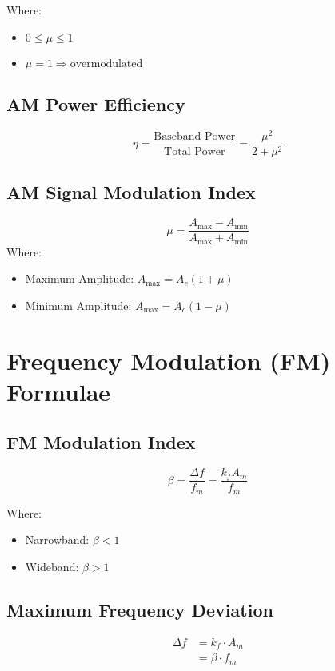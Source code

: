 \documentclass[12pt]{article}
\begin{document}
\noindent Where:
\begin{itemize}
	\item $0 \leq \mu \leq 1$
	\item $\mu = 1 \Rightarrow \text{overmodulated}$
\end{itemize}

\subsection{AM Power Efficiency}
\[
	\eta = \frac{\text{Baseband Power}}{\text{Total Power}} = \frac{\mu^2}{2 + \mu^2}
\]

\subsection{AM Signal Modulation Index}
\[
	\mu = \frac{A_{\text{max}} - A_{\text{min}}}{A_{\text{max}} + A_{\text{min}}}
\]
\noindent Where:
\begin{itemize}
	\item Maximum Amplitude: $A_{\text{max}} = A_c(1+\mu)$
	\item Minimum Amplitude: $A_{\text{max}} = A_c(1-\mu)$
\end{itemize}

\section{Frequency Modulation (FM) Formulae}

\subsection{FM Modulation Index}
\[
	\beta = \frac{\Delta f}{f_m} = \frac{k_f A_m}{f_m}
\]

\noindent Where:
\begin{itemize}
	\item Narrowband: \( \beta < 1 \)
	\item Wideband: \( \beta > 1 \)
\end{itemize}

\subsection{Maximum Frequency Deviation}
\begin{align*}
	\Delta f & = k_f \cdot A_m   \\
	         & = \beta \cdot f_m
\end{align*}
\end{document}
